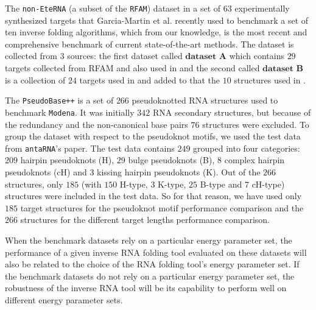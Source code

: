 The \texttt{non-EteRNA} (a subset of the \texttt{RFAM}) dataset in a set of \(63\) experimentally synthesized targets that Garcia-Martin et al. \cite{garcia2013rnaifold} recently used to benchmark a set of ten inverse folding algorithms, which from our knowledge, is the most recent and comprehensive benchmark of current state-of-the-art methods. The dataset is collected from \(3\) sources: the first dataset called \(\textbf{dataset A}\) which contains \(29\) targets collected from RFAM and also used in \cite{esmaili2015erd,taneda2011modena} and the second called \(\textbf{dataset B}\) is a collection of \(24\) targets used in \cite{esmaili2015erd} and added to that the \(10\) structures used in \cite{shi2018sentrna}.

The \texttt{PseudoBase++} is a set of $266$ pseudoknotted RNA structures used to benchmark \texttt{Modena}. It was initially $342$ RNA secondary structures, but because of the redundancy and the non-canonical base pairs  $76$ structures were excluded. To group the dataset with respect to the pseudoknot motifs, we used the test data from \texttt{antaRNA}'s paper. The test data contains $249$ grouped into four categories: $209$ hairpin pseudoknots (H), $29$ bulge pseudoknots (B), $8$ complex hairpin pseudoknots (cH) and $3$ kissing hairpin pseudoknots (K). Out of the $266$ structures, only $185$ (with $150$ H-type, $3$ K-type, $25$ B-type and $7$ cH-type) structures were included in the test data. So for that reason, we have used only $185$ target structures for the pseudoknot motif performance comparison and the $266$ structures for the different target lengths performance comparison.

When the benchmark datasets rely on a particular energy parameter set, the performance of a given inverse RNA folding tool evaluated on these datasets will also be related to the choice of the RNA folding tool's energy parameter set. If the benchmark datasets do not rely on a particular energy parameter set, the robustness of the inverse RNA tool will be its capability to perform well on different energy parameter sets.

